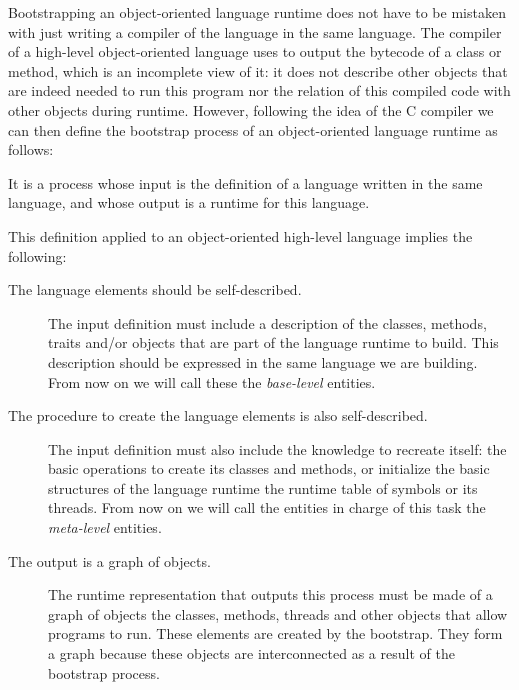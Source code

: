 Bootstrapping an object-oriented language runtime does not have to be mistaken with just writing a compiler of the language in the same language. The compiler of a high-level object-oriented language uses to output the bytecode of a class or method, which is an incomplete view of it: it does not describe other objects that are indeed needed to run this program nor the relation of this compiled code with other objects during runtime. However, following the idea of the C compiler we can then define the bootstrap process of an object-oriented language runtime as follows:

\begin{definition}
It is a process whose input is the definition of a language written in the same language, and whose output is a runtime for this language.
\end{definition}

This definition applied to an object-oriented high-level language implies the following:

\begin{description}

\item[The language elements should be self-described.] The input definition must include a description of the classes, methods, traits and/or objects that are part of the language runtime to build. This description should be expressed in the same language we are building. From now on we will call these the \emph{base-level} entities.

\item[The procedure to create the language elements is also self-described.] The input definition must also include the knowledge to recreate itself: the basic operations to create its classes and methods, or initialize the basic structures of the language runtime \eg the runtime table of symbols or its threads. From now on we will call the entities in charge of this task the \emph{meta-level} entities.

\item[The output is a graph of objects.] The runtime representation that outputs this process must be made of a graph of objects \ie the classes, methods, threads and other objects that allow programs to run. These elements are created by the bootstrap. They form a graph because these objects are interconnected as a result of the bootstrap process.

\end{description}

